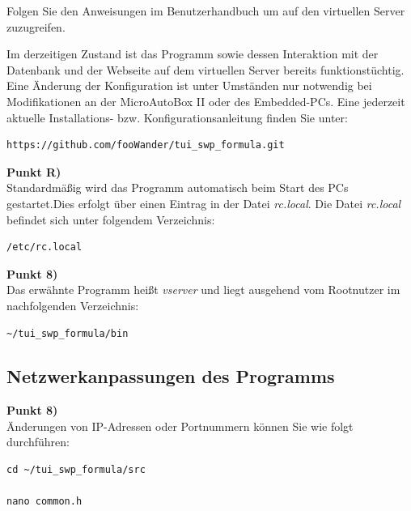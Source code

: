 \documentclass[fontsize = 12pt, paper = a4]{scrreprt}
\begin{document}
Folgen Sie den Anweisungen im Benutzerhandbuch  um auf den virtuellen Server zuzugreifen.

Im derzeitigen Zustand ist das Programm sowie dessen Interaktion mit der Datenbank und der Webseite auf dem virtuellen Server bereits funktionstüchtig. Eine Änderung der Konfiguration ist unter Umständen nur notwendig bei Modifikationen an der MicroAutoBox II oder des Embedded-PCs. Eine jederzeit aktuelle Installations- bzw. Konfigurationsanleitung finden Sie unter:

\vspace*{4mm}
\begin{lstlisting}[frame=single]
https://github.com/fooWander/tui_swp_formula.git
\end{lstlisting} 
\vspace*{-2mm}

\textbf{Punkt R)} \\

Standardmäßig wird das Programm automatisch beim Start des PCs gestartet.Dies erfolgt über einen Eintrag in der Datei \textit{rc.local}.
Die Datei \textit{rc.local} befindet sich unter folgendem Verzeichnis:

\vspace*{4mm}
\begin{lstlisting}[frame=single]
/etc/rc.local
\end{lstlisting} 
\vspace*{-2mm}

\textbf{Punkt 8)} \\

Das erwähnte Programm heißt \textit{vserver} und liegt ausgehend vom Rootnutzer im nachfolgenden Verzeichnis:

\vspace*{4mm}
\begin{lstlisting}[frame=single]
~/tui_swp_formula/bin
\end{lstlisting} 
\vspace*{-2mm}

\subsection{Netzwerkanpassungen des Programms}

\textbf{Punkt 8)} \\

Änderungen von IP-Adressen oder Portnummern können Sie wie folgt durchführen:

\vspace*{4mm}
\begin{lstlisting}[frame=single]
cd ~/tui_swp_formula/src

nano common.h
\end{lstlisting} 
\vspace*{-2mm}
\end{document}
